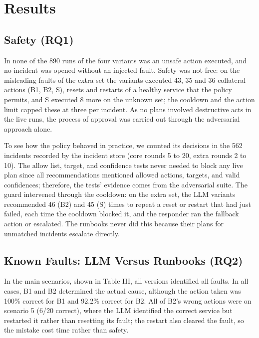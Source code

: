 \documentclass[conference,a4paper]{IEEEtran}
\begin{document}
\section{Results}

\subsection{Safety (RQ1)}

In none of the 890 runs of the four variants was an unsafe action executed, and no incident was opened without an injected fault. Safety was not free: on the misleading faults of the extra set the variants executed 43, 35 and 36 collateral actions (B1, B2, S), resets and restarts of a healthy service that the policy permits, and S executed 8 more on the unknown set; the cooldown and the action limit capped these at three per incident. As no plans involved destructive acts in the live runs, the process of approval was carried out through the adversarial approach alone.

To see how the policy behaved in practice, we counted its decisions in the 562 incidents recorded by the incident store (core rounds 5 to 20, extra rounds 2 to 10). The allow list, target, and confidence tests never needed to block any live plan since all recommendations mentioned allowed actions, targets, and valid confidences; therefore, the tests' evidence comes from the adversarial suite. The guard intervened through the cooldown: on the extra set, the LLM variants recommended 46 (B2) and 45 (S) times to repeat a reset or restart that had just failed, each time the cooldown blocked it, and the responder ran the fallback action or escalated. The runbooks never did this because their plans for unmatched incidents escalate directly.

\subsection{Known Faults: LLM Versus Runbooks (RQ2)}

In the main scenarios, shown in Table III, all versions identified all faults. In all cases, B1 and B2 determined the actual cause, although the action taken was 100\% correct for B1 and 92.2\% correct for B2. All of B2's wrong actions were on scenario 5 (6/20 correct), where the LLM identified the correct service but restarted it rather than resetting its fault; the restart also cleared the fault, so the mistake cost time rather than safety.
\end{document}

